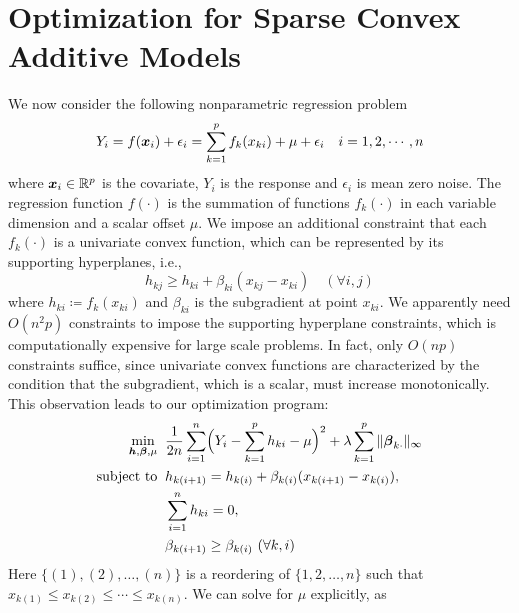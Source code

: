 \section{Optimization for Sparse Convex Additive Models}

We now consider the following nonparametric regression problem
\begin{equation}\nonumber
          Y_{i} = f(\boldsymbol{x}_{i}) + \epsilon_{i} = 
                  \sum_{k=1}^{p}f_{k}(x_{ki}) + \mu + \epsilon_{i} \quad i=1,2,\cdots,n
\end{equation}
where $\boldsymbol{x}_{i}\in\mathbb{R}^{p}$ is the covariate, $Y_{i}$ is the
response and $\epsilon_{i}$ is mean zero noise. The regression function $f(\cdot)$ is the summation of 
functions $f_{k}(\cdot)$ in each variable dimension and a scalar offset $\mu$.  
We impose an additional constraint that each $f_{k}(\cdot)$ is 
a univariate convex function, which can be represented by its supporting hyperplanes, i.e.,
\begin{equation}\label{hyper}
      h_{kj} \geq h_{ki} + \beta_{ki}(x_{kj}-x_{ki}) \quad (\forall i,j)
\end{equation}
where $h_{ki}\coloneqq f_{k}(x_{ki})$ and $\beta_{ki}$ is the
subgradient at point $x_{ki}$. We apparently need $O(n^2 p)$ constraints to
impose the supporting hyperplane constraints, which is computationally
expensive for large scale problems.  In fact, only $O(np)$
constraints suffice, since univariate convex functions are
characterized by the condition that the subgradient, which is a scalar, must
increase monotonically. This observation leads to our optimization
program:
\begin{equation}
\begin{split}
       \min_{\bds{h},\bds{\beta},\mu} & \;\; \frac{1}{2n}\sum_{i=1}^{n}
                     \Bigl( Y_{i}-\sum_{k=1}^{p}h_{ki} - \mu \Bigr)^{2} 
                         + \lambda\sum_{k=1}^{p}\|\bds{\beta}_{k\cdot}\|_{\infty} \\
       \textrm{subject to} &\;\; h_{k(i+1)} = h_{k(i)} + \beta_{k(i)}(x_{k(i+1)}-x_{k(i)}), \\
                     & \;\; \sum_{i=1}^{n}h_{ki}=0,\\
                     & \;\; \beta_{k(i+1)} \geq \beta_{k(i)} \ (\forall k, i)
\end{split}
\label{np}
\end{equation}
Here $\{(1),(2),\ldots,(n)\}$ is a reordering of $\{1,2,\ldots,n\}$ such that $x_{k(1)}\leq{}x_{k(2)}\leq\cdots\leq{}x_{k(n)}$. We can solve for $\mu$ explicitly, as  
